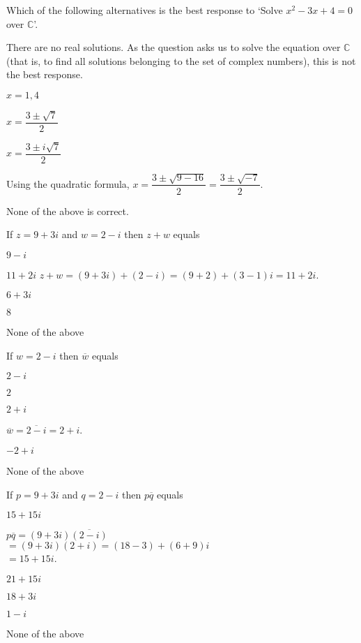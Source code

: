 \documentclass[pst2pdf]{mathquiz}
\begin{document}
\begin{question}
Which of the following alternatives is the best response to `Solve
$x^{2}-3x+4=0$ over $\mathbb{C}$'.
\begin{choice}
\incorrect There are no real solutions.
\response As the question asks us to solve the equation over $\mathbb C$ (that is, to find all solutions belonging to the set of complex numbers), this is not the best response.

\incorrect $x=1,4$

\incorrect \(x=\dfrac{3\pm\sqrt{7}}{2}\)

\correct  \(x=\dfrac{3\pm i\sqrt{7}}{2}\)

\response Using the quadratic formula,
\(x =\dfrac{3\pm\sqrt{9-16}}{2} = \dfrac{3\pm\sqrt{-7}}{2}\).


\incorrect None of the above is correct.
\end{choice}
\end{question}

\begin{question}
If $z=9+3i$ and $w=2-i$ then $z+w$ equals
\begin{choice}
\incorrect $9-i$

\correct $11+2i$
\response $z+w=(9+3i)+(2-i)=(9+2)+(3-1)i=11+2i$.

\incorrect $6+3i$

\incorrect $8$

\incorrect None of the above

\end{choice}
\end{question}


\begin{question}
If $w=2-i$ then $\overline{w}$ equals
\begin{choice}
\incorrect $2-i$

\incorrect $2$

\correct $2+i$

\response
$\overline{w}=\overline{2-i}=2+i$.

\incorrect $-2+i$

\incorrect None of the above
\end{choice}
\end{question}

\begin{question}
If $p=9+3i$ and $q=2-i$ then $p\overline{q}$ equals
\begin{center}
\end{center}
\begin{choice}

\correct $15+15i$

\response
$p\overline{q}=(9+3i)\overline{(2-i)}$ \\
$=(9+3i)(2+i)= (18-3)+(6+9)i$\\
$=15+15i$.

\incorrect $21+15i$

\incorrect $18+3i$

\incorrect $1-i$

\incorrect None of the above

\end{choice}
\end{question}
\end{document}
